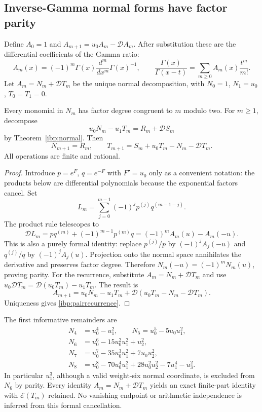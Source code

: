 \subsection{Inverse-Gamma normal forms have factor parity}

Define $A_0=1$ and $A_{m+1}=u_0A_m-\mathcal DA_m$.  After
substitution these are the differential coefficients of the Gamma ratio:
\[
 A_m(x)=(-1)^m\Gamma(x)\frac{d^m}{dx^m}\Gamma(x)^{-1},\qquad
 \frac{\Gamma(x)}{\Gamma(x-t)}
       =\sum_{m\ge0}A_m(x)\frac{t^m}{m!}.
\]
Let $A_m=N_m+\mathcal DT_m$ be the unique normal decomposition,
with $N_0=1$, $N_1=u_0$, $T_0=T_1=0$.

\begin{theorem}
\label{ibp:parity}
Every monomial in $N_m$ has factor degree congruent to $m$ modulo two.
For $m\ge1$, decompose
\[
 u_0N_m-u_1T_m=R_m+\mathcal DS_m
\]
by Theorem~\ref{ibp:normal}.  Then
\begin{equation}\label{ibp:pairrecurrence}
 N_{m+1}=R_m,\qquad
 T_{m+1}=S_m+u_0T_m-N_m-\mathcal DT_m.
\end{equation}
All operations are finite and rational.
\end{theorem}

\begin{proof}
Introduce $p=e^F$, $q=e^{-F}$ with $F'=u_0$ only as a convenient
notation: the products below are differential polynomials because the
exponential factors cancel.  Set
\[
 L_m=\sum_{j=0}^{m-1}(-1)^j p^{(j)}q^{(m-1-j)}.
\]
The product rule telescopes to
\[
 \mathcal DL_m=pq^{(m)}+(-1)^{m-1}p^{(m)}q
         =(-1)^m A_m(u)-A_m(-u).
\]
This is also a purely formal identity: replace
$p^{(j)}/p$ by $(-1)^jA_j(-u)$ and
$q^{(j)}/q$ by $(-1)^jA_j(u)$.
Projection onto the normal space annihilates the derivative and
preserves factor degree.  Therefore
$N_m(-u)=(-1)^mN_m(u)$, proving parity.
For the recurrence, substitute $A_m=N_m+\mathcal DT_m$ and use
$u_0\mathcal DT_m=\mathcal D(u_0T_m)-u_1T_m$.
The result is
\[
 A_{m+1}=u_0N_m-u_1T_m
           +\mathcal D(u_0T_m-N_m-\mathcal DT_m).
\]
Uniqueness gives \eqref{ibp:pairrecurrence}.
\end{proof}

The first informative remainders are
\begin{align*}
 N_4&=u_0^4-u_1^2,\qquad
 N_5=u_0^5-5u_0u_1^2,\\
 N_6&=u_0^6-15u_0^2u_1^2+u_2^2,\\
 N_7&=u_0^7-35u_0^3u_1^2+7u_0u_2^2,\\
 N_8&=u_0^8-70u_0^4u_1^2+28u_0^2u_2^2-7u_1^4-u_3^2.
\end{align*}
In particular $u_1^3$, although a valid weight-six normal coordinate,
is excluded from $N_6$ by parity.  Every identity
$A_m=N_m+\mathcal DT_m$ yields an exact finite-part identity with
$\mathcal E(T_m)$ retained.  No vanishing endpoint or arithmetic
independence is inferred from this formal cancellation.

